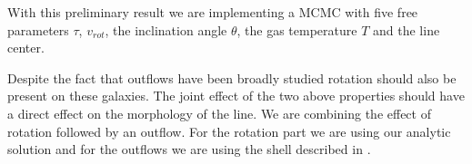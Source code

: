 With this preliminary result we are implementing a MCMC with five free
parameters  $\tau$, $v_{rot}$, the inclination angle  $\theta$, the 
gas temperature $T$ and the line center.

Despite the fact that outflows have been broadly studied rotation should 
also be present on these galaxies. The joint effect of the two above properties 
should have a direct effect on the morphology of the \lya line. We are 
 combining the effect of rotation followed by an outflow. For the rotation
part we are using our analytic solution and for the outflows
we are using the shell described in \citep{Verhamme12}. 
